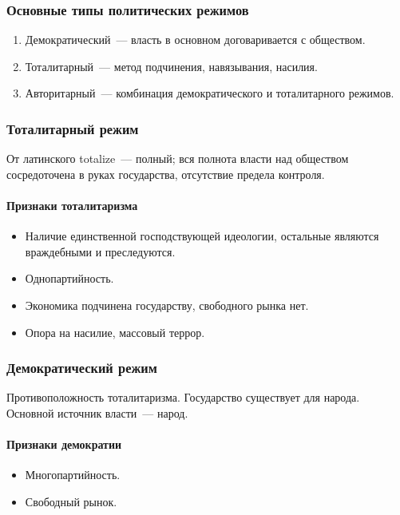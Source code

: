 \documentclass[12pt]{article}
\begin{document}
	\subsubsection{Основные типы политических режимов}
	\begin{enumerate}
		\item Демократический~--- власть в основном договаривается с обществом.
		\item Тоталитарный~--- метод подчинения, навязывания, насилия.
		\item Авторитарный~--- комбинация демократического и тоталитарного режимов.
	\end{enumerate}
	\subsubsection{Тоталитарный режим}
	\begin{definition}
		От латинского totalize~--- полный; вся полнота власти над обществом сосредоточена в руках государства, отсутствие предела контроля.
	\end{definition}
	\paragraph{Признаки тоталитаризма}
	\begin{itemize}
		\item Наличие единственной господствующей идеологии, остальные являются враждебными и преследуются.
		\item Однопартийность.
		\item Экономика подчинена государству, свободного рынка нет.
		\item Опора на насилие, массовый террор.
	\end{itemize}
	\subsubsection{Демократический режим}
	\begin{definition}
		Противоположность тоталитаризма. Государство существует для народа. Основной источник власти~--- народ.
	\end{definition}
	\paragraph{Признаки демократии}
	\begin{itemize}
		\item Многопартийность.
		\item Свободный рынок.
	\end{itemize}
\end{document}
